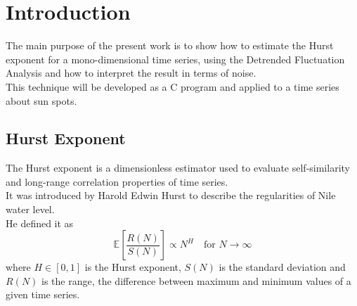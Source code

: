 \section{Introduction} 
The main purpose of the present work is to show how to estimate the Hurst exponent for a mono-dimensional time series, using the Detrended Fluctuation Analysis and how to interpret the result in terms of noise. \\
This technique will be developed as a C program and applied to a time series about sun spots.



\subsection{Hurst Exponent}
The Hurst exponent is a dimensionless estimator used to evaluate self-similarity and long-range correlation properties of time series. \\
It was introduced by Harold Edwin Hurst to describe the regularities of Nile water level. \\
He defined it as
\begin{equation}
\mathbb{E} \left[\frac{R(N)}{S(N)}\right] \propto N^{H} \quad \text{for } N \to \infty
\end{equation}
where $H \in \left[0, 1 \right] $ is the Hurst exponent, $S (N)$ is the standard deviation and $R(N)$ is the range, the difference between maximum and minimum values of a given time series.

